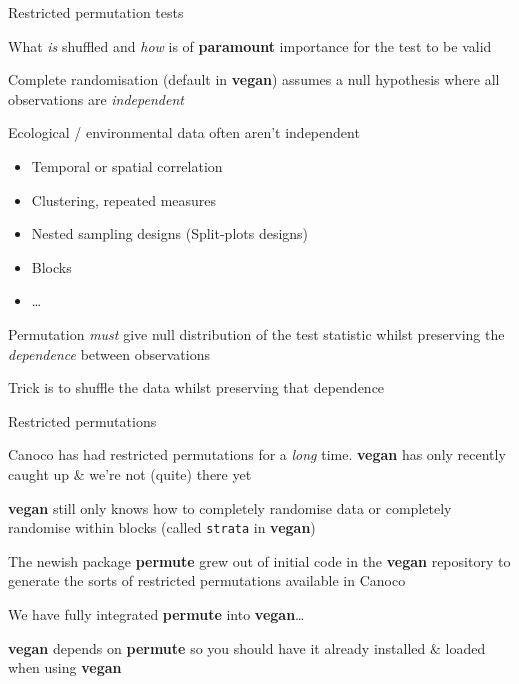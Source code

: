 \documentclass[10pt,ignorenonframetext,compress, aspectratio=169]{beamer}
\begin{document}
\begin{frame}{Restricted permutation tests}

What \emph{is} shuffled and \emph{how} is of \textbf{paramount}
importance for the test to be valid

Complete randomisation (default in \textbf{vegan}) assumes a null
hypothesis where all observations are \emph{independent}

Ecological / environmental data often aren't independent

\begin{itemize}
\itemsep1pt\parskip0pt
\item
  Temporal or spatial correlation
\item
  Clustering, repeated measures
\item
  Nested sampling designs (Split-plots designs)
\item
  Blocks
\item
  \ldots{}
\end{itemize}

Permutation \emph{must} give null distribution of the test statistic
whilst preserving the \emph{dependence} between observations

Trick is to shuffle the data whilst preserving that dependence

\end{frame}

\begin{frame}{Restricted permutations}

Canoco has had restricted permutations for a \emph{long} time.
\textbf{vegan} has only recently caught up \& we're not (quite) there
yet

\textbf{vegan} still only knows how to completely randomise data or
completely randomise within blocks (called \texttt{strata} in
\textbf{vegan})

The newish package \textbf{permute} grew out of initial code in the
\textbf{vegan} repository to generate the sorts of restricted
permutations available in Canoco

We have fully integrated \textbf{permute} into \textbf{vegan}\ldots{}

\textbf{vegan} depends on \textbf{permute} so you should have it already
installed \& loaded when using \textbf{vegan}

\end{frame}
\end{document}
